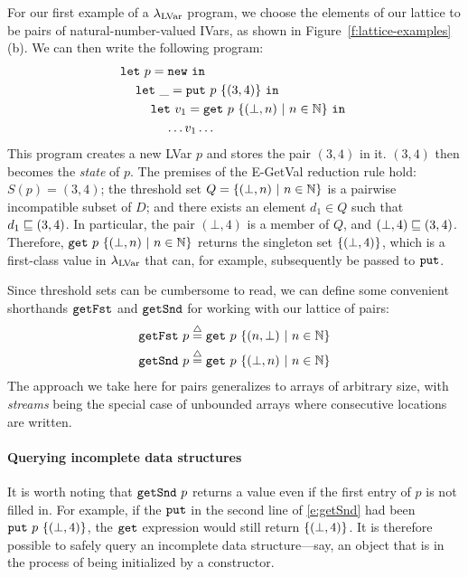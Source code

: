 For our first example of a $\lambda_{\textrm{LVar}}$ program, we choose the elements of our lattice to be
pairs of natural-number-valued IVars, as shown in 
Figure~\ref{f:lattice-examples}(b).
We can then write the following
program:
\begin{equation}
\begin{split}
& \letexp{p}{\NEW}{ \\
& \letspace \letexp{\_}{\putexp{p}{\stateset{(3,4)}}}{ \\
& \letspace \letspace \letexp{v_1}{\getexp{p}{\stateset{(\bot, n) \setsep n \in \mathbb{N}}}}{ \\
& \letspace \letspace \letspace \dots v_1 \dots}}}
\end{split}
\label{e:getSnd}
\end{equation}
This program creates a new LVar $p$ and stores the pair $(3, 4)$ in
it.  $(3,4)$ then becomes the {\em state} of $p$.  The premises of the
{\sc E-GetVal} reduction rule hold: $S(p) = (3,4)$; the threshold set $Q =
\lbrace (\bot, n) \ | \  n \in \mathbb{N} \rbrace$ is a 
pairwise incompatible subset of $D$; and there exists an element $d_1 \in Q$
such that $d_1 \sqsubseteq (3,4)$.  In
particular, the pair $(\bot, 4)$ is a member of $Q$, and $(\bot,4)
\sqsubseteq (3,4)$.  Therefore,
$\mbox{\texttt{get}}~p~\lbrace (\bot, n) \ | \  n \in \mathbb{N} \rbrace$ returns
the singleton set $\lbrace (\bot,4) \rbrace$,
{which is a first-class value in $\lambda_{\textrm{LVar}}$ that can, for example, subsequently be passed to $\mbox{\texttt{put}}$.}

Since threshold sets can be cumbersome to read, we can define some
convenient shorthands $\mbox{\texttt{getFst}}$ and $\mbox{\texttt{getSnd}}$ for working with our
lattice of pairs:
\begin{align*}
\mbox{\texttt{getFst}}~p \stackrel{\triangle}{=} \mbox{\texttt{get}}~p~\lbrace (n, \bot) \ | \  n \in
    \mathbb{N} \rbrace \\
\mbox{\texttt{getSnd}}~p \stackrel{\triangle}{=} \mbox{\texttt{get}}~p~\lbrace (\bot, n) \ | \  n \in
    \mathbb{N} \rbrace
\end{align*}
The approach we take here for pairs generalizes to arrays of arbitrary
size, with {\em streams} being the special case of unbounded arrays
where consecutive locations are written.

\paragraph{Querying incomplete data structures}
It is worth noting that $\mbox{\texttt{getSnd}}~p$ returns a value even if the
first entry of $p$ is not filled in.  For example, if the $\mbox{\texttt{put}}$ in
the second line of \eqref{e:getSnd} had been
$\mbox{\texttt{put}}~p~\lbrace (\bot,4) \rbrace$, the $\mbox{\texttt{get}}$ expression would still
return $\lbrace (\bot,4) \rbrace$.  It is therefore possible to safely
query an incomplete data structure---say, an object that is in the
process of being initialized by a constructor.  

